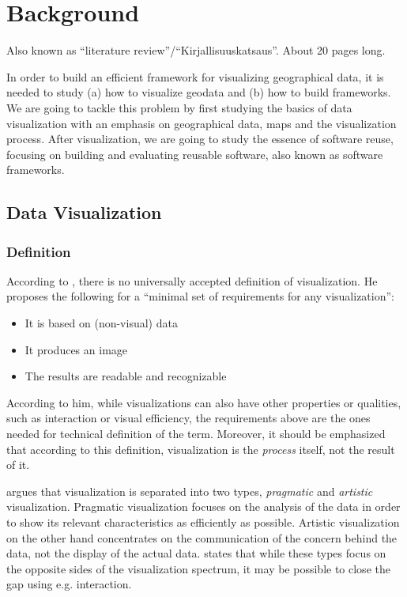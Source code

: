 
\chapter{Background}
\label{chapter:background} 

Also known as ``literature review''/``Kirjallisuuskatsaus''. About 20 pages long.

In order to build an efficient framework for visualizing geographical data, it is needed to study (a) how to visualize geodata and (b) how to build frameworks. We are going to tackle this problem by first studying the basics of data visualization with an emphasis on geographical data, maps and the visualization process. After visualization, we are going to study the essence of software reuse, focusing on building and evaluating reusable software, also known as software frameworks.

\section{Data Visualization}

\subsection{Definition}

According to \citet[chap.~3]{kosara_visualization_2007}, there is no universally accepted definition of visualization. He proposes the following for a ``minimal set of requirements for any visualization'':

\begin{itemize}
	\item It is based on (non-visual) data
	\item It produces an image
	\item The results are readable and recognizable
\end{itemize}

According to him, while visualizations can also have other properties or qualities, such as interaction or visual efficiency, the requirements above are the ones needed for technical definition of the term. Moreover, it should be emphasized that according to this definition, visualization is the \emph{process} itself, not the result of it.

\citet[chap.~4]{kosara_visualization_2007} argues that visualization is separated into two types, \emph{pragmatic} and \emph{artistic} visualization. Pragmatic visualization focuses on the analysis of the data in order to show its relevant characteristics as efficiently as possible. Artistic visualization on the other hand concentrates on the communication of the concern behind the data, not the display of the actual data. \citeauthor{kosara_visualization_2007} states that while these types focus on the opposite sides of the visualization spectrum, it may be possible to close the gap using e.g. interaction.

